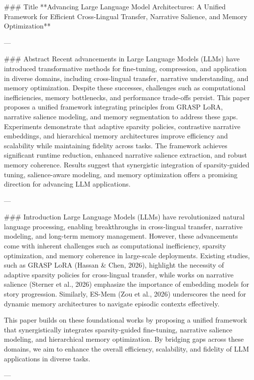 ### Title
**Advancing Large Language Model Architectures: A Unified Framework for Efficient Cross-Lingual Transfer, Narrative Salience, and Memory Optimization**

---

### Abstract
Recent advancements in Large Language Models (LLMs) have introduced transformative methods for fine-tuning, compression, and application in diverse domains, including cross-lingual transfer, narrative understanding, and memory optimization. Despite these successes, challenges such as computational inefficiencies, memory bottlenecks, and performance trade-offs persist. This paper proposes a unified framework integrating principles from GRASP LoRA, narrative salience modeling, and memory segmentation to address these gaps. Experiments demonstrate that adaptive sparsity policies, contrastive narrative embeddings, and hierarchical memory architectures improve efficiency and scalability while maintaining fidelity across tasks. The framework achieves significant runtime reduction, enhanced narrative salience extraction, and robust memory coherence. Results suggest that synergistic integration of sparsity-guided tuning, salience-aware modeling, and memory optimization offers a promising direction for advancing LLM applications.

---

### Introduction
Large Language Models (LLMs) have revolutionized natural language processing, enabling breakthroughs in cross-lingual transfer, narrative modeling, and long-term memory management. However, these advancements come with inherent challenges such as computational inefficiency, sparsity optimization, and memory coherence in large-scale deployments. Existing studies, such as GRASP LoRA (Hassan & Chen, 2026), highlight the necessity of adaptive sparsity policies for cross-lingual transfer, while works on narrative salience (Sterner et al., 2026) emphasize the importance of embedding models for story progression. Similarly, ES-Mem (Zou et al., 2026) underscores the need for dynamic memory architectures to navigate episodic contexts effectively.

This paper builds on these foundational works by proposing a unified framework that synergistically integrates sparsity-guided fine-tuning, narrative salience modeling, and hierarchical memory optimization. By bridging gaps across these domains, we aim to enhance the overall efficiency, scalability, and fidelity of LLM applications in diverse tasks.

---

